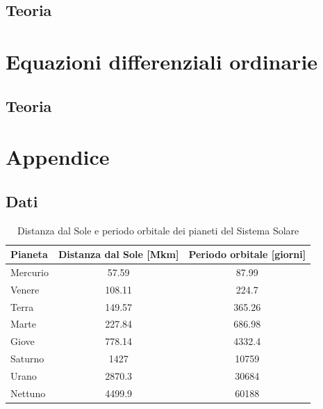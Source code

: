\documentclass[letterpaper, 12pt]{article}
\begin{document}
\subsection{Teoria}

\section{Equazioni differenziali ordinarie}
\subsection{Teoria}

\section{Appendice}
\subsection{Dati}

\begin{table}[!ht]
    \centering
    \caption{Distanza dal Sole e periodo orbitale dei pianeti del Sistema Solare}
    \label{tab:pianeti}
        \begin{tabular}{|l|c|c|}
        \hline
        \textbf{Pianeta} & \textbf{Distanza dal Sole [Mkm]} & \textbf{Periodo orbitale [giorni]} \\
        \hline
        Mercurio & 57.59   & 87.99   \\
        Venere   & 108.11  & 224.7   \\
        Terra    & 149.57  & 365.26  \\
        Marte    & 227.84  & 686.98  \\
        Giove    & 778.14  & 4332.4  \\
        Saturno  & 1427    & 10759   \\
        Urano    & 2870.3  & 30684   \\
        Nettuno  & 4499.9  & 60188   \\
        \hline
        \end{tabular}
\end{table}
\end{document}
